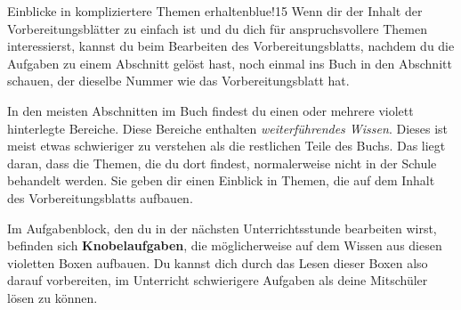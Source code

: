 \documentclass[../main.tex]{subfiles}
\begin{document}
\begin{goal}{Einblicke in kompliziertere Themen erhalten}{blue!15}
    Wenn dir der Inhalt der Vorbereitungsblätter zu einfach ist und du dich für anspruchsvollere Themen interessierst, kannst du beim Bearbeiten des Vorbereitungsblatts, nachdem du die Aufgaben zu einem Abschnitt gelöst hast, noch einmal ins Buch in den Abschnitt schauen, der dieselbe Nummer wie das Vorbereitungsblatt hat.

    In den meisten Abschnitten im Buch findest du einen oder mehrere violett hinterlegte Bereiche. Diese Bereiche enthalten \emph{weiterführendes Wissen}. Dieses ist meist etwas schwieriger zu verstehen als die restlichen Teile des Buchs. Das liegt daran, dass die Themen, die du dort findest, normalerweise nicht in der Schule behandelt werden. Sie geben dir einen Einblick in Themen, die auf dem Inhalt des Vorbereitungsblatts aufbauen. 
    
    Im Aufgabenblock, den du in der nächsten Unterrichtsstunde bearbeiten wirst, befinden sich \textbf{Knobelaufgaben}, die möglicherweise auf dem Wissen aus diesen violetten Boxen aufbauen. Du kannst dich durch das Lesen dieser Boxen also darauf vorbereiten, im Unterricht schwierigere Aufgaben als deine Mitschüler lösen zu können.
\end{goal}
\end{document}
